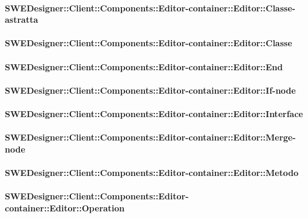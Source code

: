 			\paragraph{SWEDesigner::Client::Components::Editor-container::Editor::Classe-astratta}
				
				
			\paragraph{SWEDesigner::Client::Components::Editor-container::Editor::Classe}
				
			
			\paragraph{SWEDesigner::Client::Components::Editor-container::Editor::End}
				
				
			\paragraph{SWEDesigner::Client::Components::Editor-container::Editor::If-node}
				
				
			\paragraph{SWEDesigner::Client::Components::Editor-container::Editor::Interface}
				
				
			\paragraph{SWEDesigner::Client::Components::Editor-container::Editor::Merge-node}
				
				
			\paragraph{SWEDesigner::Client::Components::Editor-container::Editor::Metodo}
				
				
			\paragraph{SWEDesigner::Client::Components::Editor-container::Editor::Operation}
				
			

